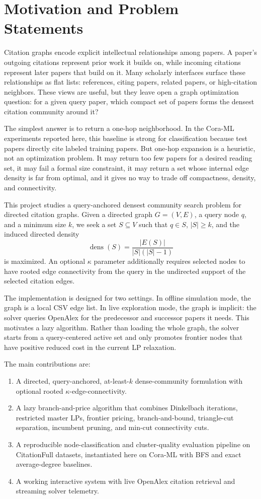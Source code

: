 \documentclass[11pt]{article}
\newcommand{\dens}{\operatorname{dens}}
\begin{document}
\section{Motivation and Problem Statements}

Citation graphs encode explicit intellectual relationships among papers. A
paper's outgoing citations represent prior work it builds on, while incoming
citations represent later papers that build on it. Many scholarly interfaces
surface these relationships as flat lists: references, citing papers, related
papers, or high-citation neighbors. These views are useful, but they leave open
a graph optimization question: for a given query paper, which compact set of
papers forms the densest citation community around it?

The simplest answer is to return a one-hop neighborhood. In the Cora-ML
experiments reported here, this baseline is strong for classification
because test papers directly cite labeled training papers. But
one-hop expansion is a
heuristic, not an optimization problem. It may return too few papers for a
desired reading set, it may fail a formal size constraint, it may return a set
whose internal edge density is far from optimal, and it gives no way to trade
off compactness, density, and connectivity.

This project studies a query-anchored densest community search problem for
directed citation graphs. Given a directed graph $G=(V,E)$, a query node $q$,
and a minimum size $k$, we seek a set $S \subseteq V$ such that $q \in S$,
$|S| \geq k$, and the induced directed density
\[
  \dens(S) = \frac{|E(S)|}{|S|(|S|-1)}
\]
is maximized. An optional $\kappa$ parameter additionally requires selected
nodes to have rooted edge connectivity from the query in the undirected support
of the selected citation edges.

The implementation is designed for two settings. In offline simulation mode, the
graph is a local CSV edge list. In live exploration mode, the graph is implicit:
the solver queries OpenAlex for the predecessor and successor papers it needs.
This motivates a lazy algorithm. Rather than loading the whole graph, the solver
starts from a query-centered active set and only promotes frontier nodes that
have positive reduced cost in the current LP relaxation.

The main contributions are:
\begin{enumerate}[leftmargin=1.2cm]
  \item A directed, query-anchored, at-least-$k$ dense-community formulation
  with optional rooted $\kappa$-edge-connectivity.
  \item A lazy branch-and-price algorithm that combines Dinkelbach iterations,
  restricted master LPs, frontier pricing, branch-and-bound, triangle-cut
  separation, incumbent pruning, and min-cut connectivity cuts.
  \item A reproducible node-classification and cluster-quality evaluation
  pipeline on CitationFull datasets, instantiated here on Cora-ML with BFS and
  exact average-degree baselines.
  \item A working interactive system with live OpenAlex citation retrieval and
  streaming solver telemetry.
\end{enumerate}
\end{document}
